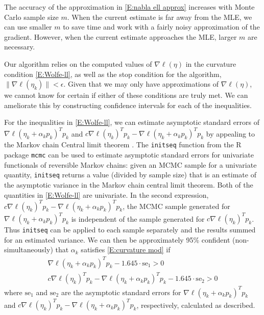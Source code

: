The accuracy of the approximation in \eqref{E:nabla ell approx} increases with Monte 
Carlo sample size $m$. 
When the current estimate is far away from the MLE, we can use smaller $m$ to save 
time and work with a 
fairly noisy approximation of the gradient.  However, when the current estimate 
approaches the MLE, larger $m$ are necessary.

Our algorithm relies on the computed values of $\nabla \ell(\eta)$ in the curvature 
condition \eqref{E:Wolfe-ll}, 
as well as the stop condition for the algorithm, $\lVert \nabla \ell( \eta_k ) \rVert 
< \epsilon$.  Given that we may 
only have approximations of $\nabla \ell(\eta)$, we cannot know for certain if either 
of these conditions are truly 
met.  We can ameliorate this by constructing confidence intervals for each of the 
inequalities.  

For the inequalities in \eqref{E:Wolfe-ll}, we can estimate asymptotic standard 
errors of $\nabla \ell( \eta_k + 
\alpha_k p_k)^T p_k$  and $c \nabla \ell(\eta_k)^T p_k - \nabla \ell( \eta_k + 
\alpha_k p_k)^T p_k$ by appealing to the 
Markov chain Central limit theorem 
\citep{Chan:1994,Jones:2004,Roberts:1997,Roberts:2004}.
The \texttt{initseq} function from the R package \texttt{mcmc} \citep{mcmc:R} can be 
used to estimate asymptotic 
standard errors for univariate functionals of reversible Markov chains: given an MCMC 
sample for a univariate 
quantity, \texttt{initseq}
returns a value (divided by sample size) that is an estimate of the asymptotic 
variance in the Markov chain central 
limit theorem.  Both of the quantities in \eqref{E:Wolfe-ll} are univariate.  In 
the second expression, $c \nabla \ell(\eta_k)^T 
p_k - \nabla \ell( \eta_k + \alpha_k p_k)^T p_k$, the MCMC sample generated for $
\nabla \ell( \eta_k + \alpha_k p_k)^T 
p_k$ is independent of the sample generated for $c \nabla \ell(\eta_k)^T p_k$.  Thus 
\texttt{initseq} can be applied 
to each sample separately and the results summed for an estimated variance.  
We can then be approximately 95\% confident (non-simultaneously) that $\alpha_k$ 
satisfies \eqref{E:curvature 
mod} if
\begin{align*}
	 \nabla \ell( \eta_k + \alpha_k p_k)^T p_k - 1.645 \cdot \text{se}_1 > 0 \\
	 c \nabla \ell(\eta_k)^T p_k - \nabla \ell( \eta_k + \alpha_k p_k)^T p_k - 1.645 
\cdot \text{se}_2 > 0 
\end{align*}
where $\text{se}_1$ and $\text{se}_2$ are the asymptotic standard errors for $\nabla 
\ell( \eta_k + \alpha_k p_k)^T p_k
$  and $c \nabla \ell(\eta_k)^T p_k - \nabla \ell( \eta_k + \alpha_k p_k)^T p_k$, 
respectively, calculated as described.

